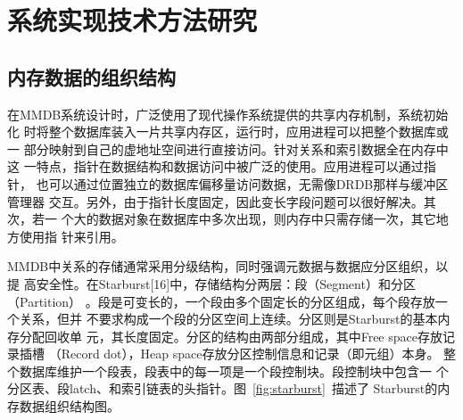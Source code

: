 \documentclass[literaturereview]{zjutreport}
\begin{document}
\begin{table}[htbp]
\caption{主流内存数据库}\label{tab:table2}
\vspace{\baselineskip}
\end{table}

\chapter{系统实现技术方法研究}
\section{内存数据的组织结构}
在MMDB系统设计时，广泛使用了现代操作系统提供的共享内存机制，系统初始化
时将整个数据库装入一片共享内存区，运行时，应用进程可以把整个数据库或一
部分映射到自己的虚地址空间进行直接访问。针对关系和索引数据全在内存中这
一特点，指针在数据结构和数据访问中被广泛的使用。应用进程可以通过指针，
也可以通过位置独立的数据库偏移量访问数据，无需像DRDB那样与缓冲区管理器
交互。另外，由于指针长度固定，因此变长字段问题可以很好解决。其次，若一
个大的数据对象在数据库中多次出现，则内存中只需存储一次，其它地方使用指
针来引用。

MMDB中关系的存储通常采用分级结构，同时强调元数据与数据应分区组织，以提
高安全性。在Starburst[16]中，存储结构分两层：段（Segment）和分区（Partition）
。段是可变长的，一个段由多个固定长的分区组成，每个段存放一个关系，但并
不要求构成一个段的分区空间上连续。分区则是Starburst的基本内存分配回收单
元，其长度固定。分区的结构由两部分组成，其中Free space存放记录插槽
（Record dot），Heap space存放分区控制信息和记录（即元组）本身。
整个数据库维护一个段表，段表中的每一项是一个段控制块。段控制块中包含一
个分区表、段latch、和索引链表的头指针。图~\ref{fig:starburst}~描述了
Starburst的内存数据组织结构图。
\end{document}
